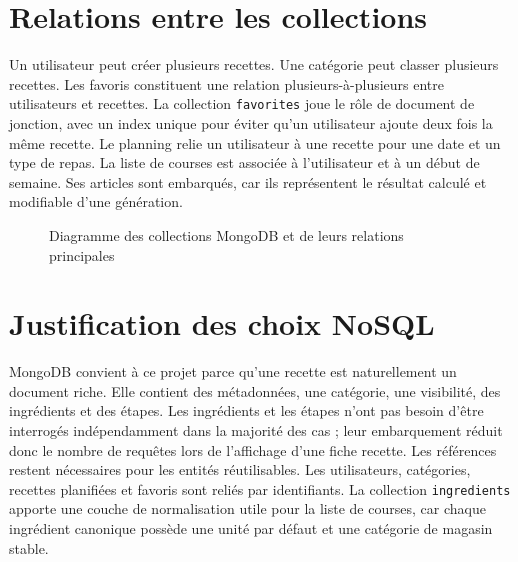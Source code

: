 \documentclass[12pt,a4paper]{report}
\begin{document}
\section{Relations entre les collections}
Un utilisateur peut créer plusieurs recettes. Une catégorie peut classer plusieurs recettes. Les favoris constituent une relation plusieurs-à-plusieurs entre utilisateurs et recettes. La collection \texttt{favorites} joue le rôle de document de jonction, avec un index unique pour éviter qu'un utilisateur ajoute deux fois la même recette. Le planning relie un utilisateur à une recette pour une date et un type de repas. La liste de courses est associée à l'utilisateur et à un début de semaine. Ses articles sont embarqués, car ils représentent le résultat calculé et modifiable d'une génération.

\begin{figure}[H]
\centering
{}
\caption{Diagramme des collections MongoDB et de leurs relations principales}
\label{fig:relations}
\end{figure}

\section{Justification des choix NoSQL}
MongoDB convient à ce projet parce qu'une recette est naturellement un document riche. Elle contient des métadonnées, une catégorie, une visibilité, des ingrédients et des étapes. Les ingrédients et les étapes n'ont pas besoin d'être interrogés indépendamment dans la majorité des cas ; leur embarquement réduit donc le nombre de requêtes lors de l'affichage d'une fiche recette. Les références restent nécessaires pour les entités réutilisables. Les utilisateurs, catégories, recettes planifiées et favoris sont reliés par identifiants. La collection \texttt{ingredients} apporte une couche de normalisation utile pour la liste de courses, car chaque ingrédient canonique possède une unité par défaut et une catégorie de magasin stable.
\end{document}
